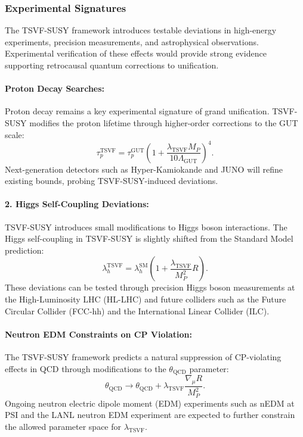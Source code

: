 \documentclass[twocolumn,superscriptaddress,floatfix]{revtex4-2}
\begin{document}
\subsubsection{Experimental Signatures}
\label{subsec:experimental_signatures}

The TSVF-SUSY framework introduces testable deviations in high-energy experiments, precision measurements, and astrophysical observations. Experimental verification of these effects would provide strong evidence supporting retrocausal quantum corrections to unification.

\paragraph{Proton Decay Searches:}  
Proton decay remains a key experimental signature of grand unification. TSVF-SUSY modifies the proton lifetime through higher-order corrections to the GUT scale:
\begin{equation}
\tau_p^{\text{TSVF}} = \tau_p^{\text{GUT}}\left(1 + \frac{\lambda_{\text{TSVF}} M_P}{10\Lambda_{\text{GUT}}}\right)^4.
\end{equation}
Next-generation detectors such as Hyper-Kamiokande \cite{HyperK} and JUNO will refine existing bounds, probing TSVF-SUSY-induced deviations.

\paragraph{2. Higgs Self-Coupling Deviations:}  
TSVF-SUSY introduces small modifications to Higgs boson interactions. The Higgs self-coupling in TSVF-SUSY is slightly shifted from the Standard Model prediction:
\begin{equation}
\lambda_h^{\text{TSVF}} = \lambda_h^{\text{SM}} \left(1 + \frac{\lambda_{\text{TSVF}}}{M_P^2} R \right).
\end{equation}
These deviations can be tested through precision Higgs boson measurements at the High-Luminosity LHC (HL-LHC) and future colliders such as the Future Circular Collider (FCC-hh) and the International Linear Collider (ILC).

\paragraph{Neutron EDM Constraints on CP Violation:}  
The TSVF-SUSY framework predicts a natural suppression of CP-violating effects in QCD through modifications to the $\theta_{\text{QCD}}$ parameter:
\begin{equation}
\theta_{\text{QCD}} \to \theta_{\text{QCD}} + \lambda_{\text{TSVF}} \frac{\nabla_\mu R}{M_P^2}.
\end{equation}
Ongoing neutron electric dipole moment (EDM) experiments such as nEDM at PSI and the LANL neutron EDM experiment are expected to further constrain the allowed parameter space for $\lambda_{\text{TSVF}}$.
\end{document}
